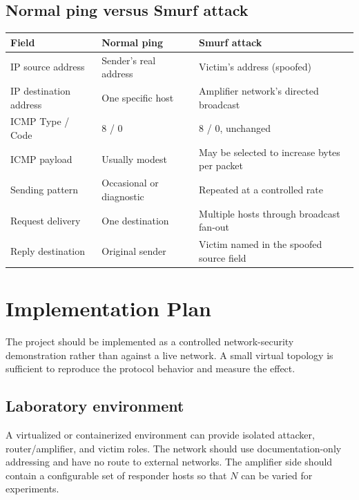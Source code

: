 \documentclass[12pt,a4paper]{article}
\begin{document}
\subsection{Normal ping versus Smurf attack}
\begin{center}
\small
\begin{tabular}{@{}p{3.3cm} p{5.0cm} p{6.8cm}@{}}
\hline
\textbf{Field} & \textbf{Normal ping} & \textbf{Smurf attack}\\
\hline
IP source address & Sender's real address & Victim's address (spoofed)\\
IP destination address & One specific host & Amplifier network's directed broadcast\\
ICMP Type / Code & 8 / 0 & 8 / 0, unchanged\\
ICMP payload & Usually modest & May be selected to increase bytes per packet\\
Sending pattern & Occasional or diagnostic & Repeated at a controlled rate\\
Request delivery & One destination & Multiple hosts through broadcast fan-out\\
Reply destination & Original sender & Victim named in the spoofed source field\\
\hline
\end{tabular}
\end{center}

\section{Implementation Plan}
The project should be implemented as a controlled network-security demonstration rather than against a live network. A small virtual topology is sufficient to reproduce the protocol behavior and measure the effect.

\subsection{Laboratory environment}
A virtualized or containerized environment can provide isolated attacker, router/amplifier, and victim roles. The network should use documentation-only addressing and have no route to external networks. The amplifier side should contain a configurable set of responder hosts so that $N$ can be varied for experiments.
\end{document}
